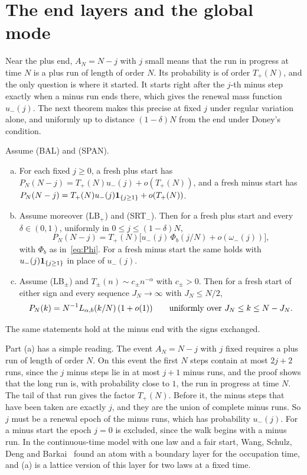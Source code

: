 \section{The end layers and the global mode}\label{sec:ends}

Near the plus end, $A_N=N-j$ with $j$ small means that the run in progress at time $N$
is a plus run of length of order $N$. Its probability is of order $T_\plus(N)$, and the
only question is where it started. It starts right after the $j$-th minus step exactly
when a minus run ends there, which gives the renewal mass function $u_\minus(j)$. The
next theorem makes this precise at fixed $j$ under regular variation alone, and
uniformly up to distance $(1-\delta)N$ from the end under Doney's condition.

\begin{introtheorem}\label{thm:ends}
Assume (BAL) and (SPAN).
\begin{enumerate}[(a)]
\item For each fixed $j\ge0$, a fresh plus start has
$P_N(N-j)=T_\plus(N)u_\minus(j)+o(T_\plus(N))$, and a fresh minus start has
$P_N(N-j)=T_{+}(N)u_{-}(j)\mathbf{1}_{\{j\ge1\}}+o(T_{+}(N))$.
\item Assume moreover (LB$_\plus$) and (SRT$_\minus$). Then for a fresh plus start and
every $\delta\in(0,1)$, uniformly in $0\le j\le(1-\delta)N$,
\[
 P_N(N-j)=T_\plus(N)\bigl[u_\minus(j)\,\Phi_b(j/N)+o(\omega_\minus(j))\bigr],
\]
with $\Phi_b$ as in~\eqref{eq:Phi}. For a fresh minus start the same holds with
$u_{-}(j)\mathbf{1}_{\{j\ge1\}}$ in place of $u_\minus(j)$.
\item Assume (LB$_\pm$) and $T_\pm(n)\sim c_\pm n^{-\alpha}$ with $c_\pm>0$. Then for a
fresh start of either sign and every sequence $J_N\to\infty$ with $J_N\le N/2$,
\[
 P_N(k)=N^{-1}L_{\alpha,b}(k/N)\,(1+o(1))\qquad\text{uniformly over }J_N\le k\le N-J_N .
\]
\end{enumerate}
The same statements hold at the minus end with the signs exchanged.
\end{introtheorem}

Part (a) has a simple reading. The event $A_N=N-j$ with $j$ fixed requires a plus run of length
of order $N$. On this event the first $N$ steps contain at most $2j+2$ runs, since the $j$
minus steps lie in at most $j+1$ minus runs, and the proof shows that the long run is, with
probability close to $1$, the run in progress at time $N$. The tail of
that run gives the factor $T_\plus(N)$. Before it, the minus steps that have been taken are
exactly $j$, and they are the union of complete minus runs. So $j$ must be a renewal epoch of
the minus runs, which has probability $u_\minus(j)$. For a minus start the epoch $j=0$ is
excluded, since the walk begins with a minus run. In the continuous-time model with one law
and a fair start, Wang, Schulz, Deng and Barkai~\cite[Section~VII.A]{wsdb2018} found an atom
with a boundary layer for the occupation time, and (a) is a lattice version of this layer for
two laws at a fixed time.

